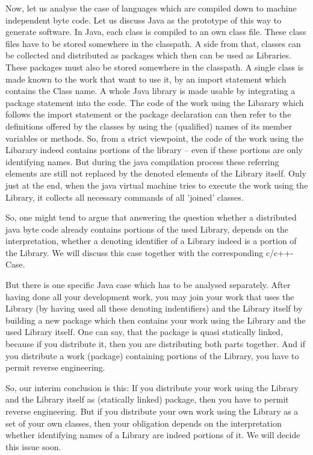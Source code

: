 Now, let us analyse the case of languages which are compiled down to machine
independent byte code. Let us discuss Java as the prototype of this way to
generate software. In Java, each class is compiled to an own class file. These
class files have to be stored somewhere in the classpath. A side from that,
classes can be collected and distributed as packages which then can be used as
Libraries. These packages must also be stored somewhere in the classpath. A
single class is made known to the work that want to use it, by an import
statement which contains the Class name. A whole Java library is made usable by
integrating a package statement into the code. The code of the work using the
Libarary which follows the import statement or the package declaration can then
refer to the definitions offered by the classes by using the (qualified) names
of its member variables or methods. So, from a strict viewpoint, the code of the
work using the Libarary indeed contains portions of the library -- even if these
portions are only identifying names. But during the java compilation
process these referring elements are still not replaced by the denoted elements
of the Library itself. Only just at the end, when the java virtual machine tries
to execute the work using the Library, it collects all necessary commands of all
'joined' classes.

So, one might tend to argue that answering the question whether a distributed
java byte code already contains portions of the used Library, depends on the
interpretation, whether a denoting identifier of a Library indeed is a portion
of the Library. We will discuss this case together with the corresponding
c/c++-Case. 

But there is one specific Java case which has to be analysed separately. After
having done all your development work, you may join your work that uses the
Library (by having used all these denoting indentifiers) and the Library itself
by building a new package which then contains your work using the Library and
the used Library itself. One can say, that the package is quasi statically
linked, because if you distribute it, then you are distributing both parts
together. And if you distribute a work (package) containing portions of the
Library, you have to permit reverse engineering.

So, our interim conclusion is this: If you distribute your work using the
Library and the Library itself as (statically linked) package, then you have to
permit reverse engineering. But if you distribute your own work using the
Library as a set of your own classes, then your obligation depends on the
interpretation whether identifying names of a Library are indeed portions of it.
We will decide this issue soon.

